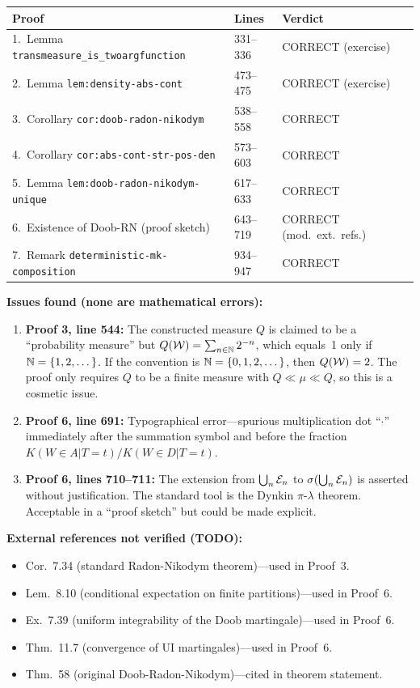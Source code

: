 \documentclass{article}
\begin{document}
\begin{center}
\begin{tabular}{l|l|l}
\textbf{Proof} & \textbf{Lines} & \textbf{Verdict} \\ \hline
1.\ Lemma \texttt{transmeasure\_is\_twoargfunction} & 331--336 & CORRECT (exercise) \\
2.\ Lemma \texttt{lem:density-abs-cont} & 473--475 & CORRECT (exercise) \\
3.\ Corollary \texttt{cor:doob-radon-nikodym} & 538--558 & CORRECT \\
4.\ Corollary \texttt{cor:abs-cont-str-pos-den} & 573--603 & CORRECT \\
5.\ Lemma \texttt{lem:doob-radon-nikodym-unique} & 617--633 & CORRECT \\
6.\ Existence of Doob-RN (proof sketch) & 643--719 & CORRECT (mod.\ ext.\ refs.) \\
7.\ Remark \texttt{deterministic-mk-composition} & 934--947 & CORRECT \\
\end{tabular}
\end{center}

\bigskip\noindent
\textbf{Issues found (none are mathematical errors):}
\begin{enumerate}
  \item \textbf{Proof 3, line 544:} The constructed measure $Q$ is claimed to
        be a ``probability measure'' but $Q(\mathcal{W}) = \sum_{n\in\mathbb{N}} 2^{-n}$,
        which equals~1 only if $\mathbb{N}=\{1,2,\dots\}$.  If the convention is
        $\mathbb{N}=\{0,1,2,\dots\}$, then $Q(\mathcal{W})=2$. The proof only requires $Q$
        to be a finite measure with $Q\ll\mu\ll Q$, so this is a cosmetic issue.

  \item \textbf{Proof 6, line 691:} Typographical error---spurious
        multiplication dot ``$\cdot$'' immediately after the summation symbol
        and before the fraction $K(W\in A|T=t)/K(W\in D|T=t)$.

  \item \textbf{Proof 6, lines 710--711:} The extension from
        $\bigcup_n\mathcal{E}_n$ to $\sigma(\bigcup_n\mathcal{E}_n)$ is asserted without
        justification.  The standard tool is the Dynkin $\pi$-$\lambda$ theorem.
        Acceptable in a ``proof sketch'' but could be made explicit.
\end{enumerate}

\bigskip\noindent
\textbf{External references not verified (TODO):}
\begin{itemize}
  \item \cite{Kle20} Cor.\ 7.34 (standard Radon-Nikodym theorem)---used in Proof~3.
  \item \cite{Kle20} Lem.\ 8.10 (conditional expectation on finite partitions)---used in Proof~6.
  \item \cite{Kle20} Ex.\ 7.39 (uniform integrability of the Doob martingale)---used in Proof~6.
  \item \cite{Kle20} Thm.\ 11.7 (convergence of UI martingales)---used in Proof~6.
  \item \cite{Del83} Thm.\ 58 (original Doob-Radon-Nikodym)---cited in theorem statement.
\end{itemize}
\end{document}
